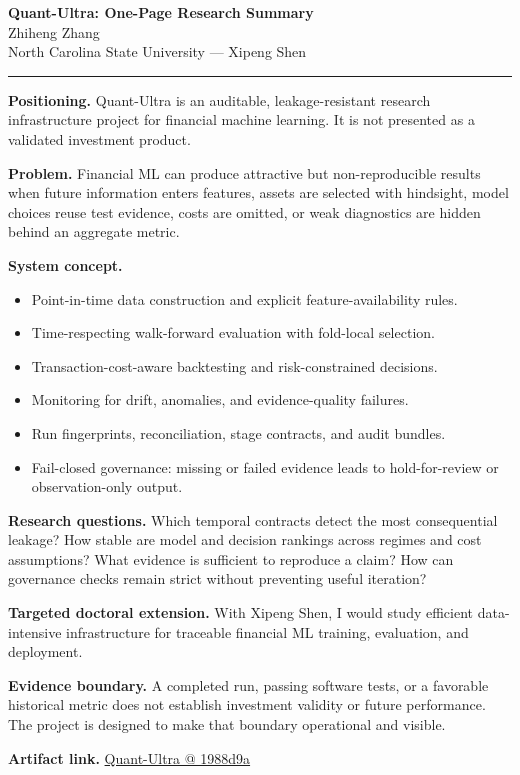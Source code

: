 \documentclass[11pt]{article}
\makeatletter
\newcommand{\ApplicantName}{Zhiheng Zhang}
\newcommand{\ApplicantGitHub}{\href{https://github.com/zhiheng-zhang-Mera/Quant-Ultra/tree/1988d9a8530da91a8158de864d098ea869098923}{Quant-Ultra @ 1988d9a}}
\makeatother
\begin{document}
\begin{center}
{\LARGE\bfseries Quant-Ultra: One-Page Research Summary}\\[0.25em]
{\large \ApplicantName}\\
North Carolina State University --- Xipeng Shen
\end{center}
\vspace{0.35em}\hrule\vspace{0.65em}

\textbf{Positioning.} Quant-Ultra is an auditable, leakage-resistant research infrastructure project for financial machine learning. It is not presented as a validated investment product.

\textbf{Problem.} Financial ML can produce attractive but non-reproducible results when future information enters features, assets are selected with hindsight, model choices reuse test evidence, costs are omitted, or weak diagnostics are hidden behind an aggregate metric.

\textbf{System concept.}
\begin{itemize}
\item Point-in-time data construction and explicit feature-availability rules.
\item Time-respecting walk-forward evaluation with fold-local selection.
\item Transaction-cost-aware backtesting and risk-constrained decisions.
\item Monitoring for drift, anomalies, and evidence-quality failures.
\item Run fingerprints, reconciliation, stage contracts, and audit bundles.
\item Fail-closed governance: missing or failed evidence leads to hold-for-review or observation-only output.
\end{itemize}

\textbf{Research questions.} Which temporal contracts detect the most consequential leakage? How stable are model and decision rankings across regimes and cost assumptions? What evidence is sufficient to reproduce a claim? How can governance checks remain strict without preventing useful iteration?

\textbf{Targeted doctoral extension.} With Xipeng Shen, I would study efficient data-intensive infrastructure for traceable financial ML training, evaluation, and deployment.

\textbf{Evidence boundary.} A completed run, passing software tests, or a favorable historical metric does not establish investment validity or future performance. The project is designed to make that boundary operational and visible.

\textbf{Artifact link.} \ApplicantGitHub
\end{document}
